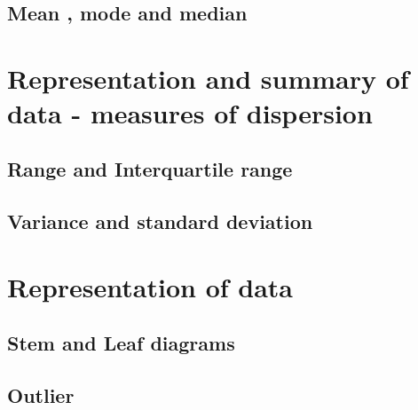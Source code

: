 \documentclass[a4paper]{article}
\begin{document}
\begin{eg}
\

\end{eg}



\begin{defi}

\end{defi}

\subsection{Mean , mode and median}
\section{Representation and summary of data - measures of dispersion}

\subsection{Range and Interquartile range}

\begin{eg}

\end{eg}

\subsection{Variance and standard deviation}

\section{Representation of data}

\subsection{Stem and Leaf diagrams}

\subsection{Outlier}
\begin{defi}

\end{defi}
\[
\]

\[
\]

\begin{eg}

\end{eg}
\end{document}
